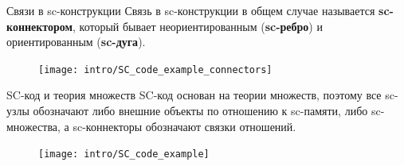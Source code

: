 \begin{frame}[shrink=5]{Связи в sc-конструкции}
  Связь в sc-конструкции в общем случае называется \textbf{sc-коннектором},
  который бывает неориентированным (\textbf{sc-ребро}) и ориентированным
  (\textbf{sc-дуга}).
  
  \begin{figure}
    \centering
    \texttt{[image: intro/SC\_code\_example\_connectors]}
  \end{figure}
\end{frame}

\begin{frame}[shrink=5]{SC-код и теория множеств}
  SC-код основан на теории множеств, поэтому все sc-узлы обозначают
  либо внешние объекты по отношению к sc-памяти, либо sc-множества, а
  sc-коннекторы обозначают связки отношений.
  
  \begin{figure}
    \centering
    \texttt{[image: intro/SC\_code\_example]}
  \end{figure}
\end{frame}

